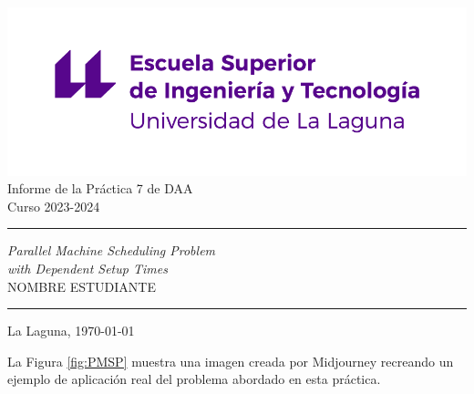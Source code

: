 \documentclass[spanish,a4paper,12pt,oneside]{extreport}
\begin{document}
\renewcommand\listtablename{Índice de Tablas}    
\renewcommand\listfigurename{Índice de Figuras}    

\pagestyle{empty}
\thispagestyle{empty}


\newcommand{\HRule}{\rule{\linewidth}{1mm}}
\setlength{\parindent}{0mm}
\setlength{\parskip}{0mm}


\begin{center}
\includegraphics[scale=0.8]{images/escuela-ingenieria-tecnologia-original}\\[10mm]
{\Huge Informe de la Práctica 7 de DAA \\[3mm] Curso 2023-2024}
\end{center}

\HRule
\begin{flushright}
        {\Huge \itshape Parallel Machine Scheduling Problem \\ with Dependent Setup Times} \\[5mm]
        {\Large NOMBRE ESTUDIANTE} \\[5mm]


\end{flushright}
\HRule
{}
\begin{center}
  \Large La Laguna, \today
\end{center}

\setlength{\parindent}{5mm}

\newpage
La Figura \ref{fig:PMSP} muestra una imagen creada por Midjourney recreando un ejemplo de aplicación real del problema abordado en esta práctica.
\end{document}
